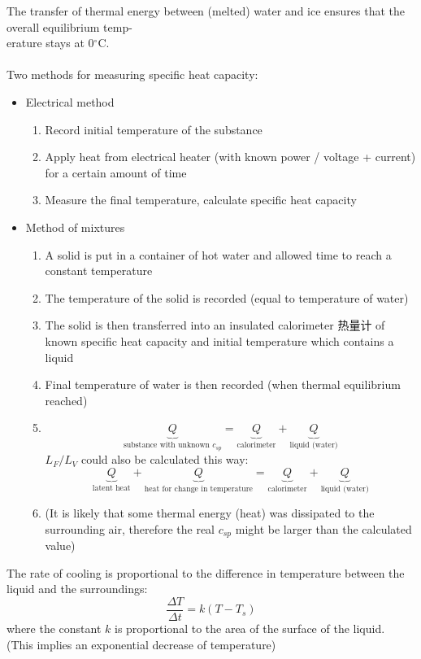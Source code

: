 The transfer of thermal energy between (melted) water and ice ensures that the overall equilibrium temp-\\erature stays at 0$^\circ$C.\\\\
Two methods for measuring specific heat capacity:
\begin{itemize}
  \item Electrical method
  \begin{enumerate}
    \item Record initial temperature of the substance
    \item Apply heat from electrical heater (with known power / voltage + current) for a certain amount of time
    \item Measure the final temperature, calculate specific heat capacity
  \end{enumerate}
  \item Method of mixtures
  \begin{enumerate}
    \item A solid is put in a container of hot water and allowed time to reach a constant temperature
    \item The temperature of the solid is recorded (equal to temperature of water)
    \item The solid is then transferred into an insulated calorimeter 热量计 of known specific heat capacity and initial temperature which contains a liquid
    \item Final temperature of water is then recorded (when thermal equilibrium reached)
    \item \[\underbrace{Q}_\text{substance with unknown $c_{sp}$}=\underbrace{Q}_\text{calorimeter}+\underbrace{Q}_\text{liquid (water)}\]
    $L_F / L_V$ could also be calculated this way:
    \[\underbrace{Q}_\text{latent heat} + \underbrace{Q}_\text{heat for change in temperature}=\underbrace{Q}_\text{calorimeter}+\underbrace{Q}_\text{liquid (water)}\]
    \item (It is likely that some thermal energy (heat) was dissipated to the surrounding air, therefore the real $c_{sp}$ might be larger than the calculated value)
  \end{enumerate}
\end{itemize}
The rate of cooling is proportional to the difference in temperature between the liquid and the surroundings:
\[\dfrac{\Delta T}{\Delta t}=k(T-T_s)\]
where the constant $k$ is proportional to the area of the surface of the liquid.\\
(This implies an exponential decrease of temperature)
